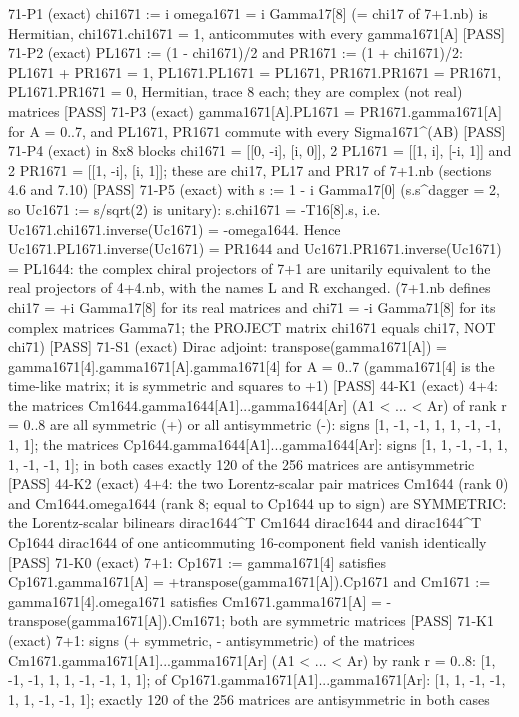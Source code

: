 \documentclass[
  10pt,
]{article}
\newenvironment{Shaded}{}{}
\newcommand{\NormalTok}[1]{#1}
\begin{document}
\begin{Shaded}
\begin{Highlighting}[]
\NormalTok{[PASS] 71{-}P1  (exact) chi1671 := i omega1671 = i Gamma17[8] (= chi17 of 7+1.nb) is Hermitian, chi1671.chi1671 = 1, anticommutes with every gamma1671[A]}
\NormalTok{[PASS] 71{-}P2  (exact) PL1671 := (1 {-} chi1671)/2 and PR1671 := (1 + chi1671)/2: PL1671 + PR1671 = 1, PL1671.PL1671 = PL1671, PR1671.PR1671 = PR1671, PL1671.PR1671 = 0, Hermitian, trace 8 each; they are complex (not real) matrices}
\NormalTok{[PASS] 71{-}P3  (exact) gamma1671[A].PL1671 = PR1671.gamma1671[A] for A = 0..7, and PL1671, PR1671 commute with every Sigma1671\^{}(AB)}
\NormalTok{[PASS] 71{-}P4  (exact) in 8x8 blocks chi1671 = [[0, {-}i], [i, 0]], 2 PL1671 = [[1, i], [{-}i, 1]] and 2 PR1671 = [[1, {-}i], [i, 1]]; these are chi17, PL17 and PR17 of 7+1.nb (sections 4.6 and 7.10)}
\NormalTok{[PASS] 71{-}P5  (exact) with s := 1 {-} i Gamma17[0] (s.s\^{}dagger = 2, so Uc1671 := s/sqrt(2) is unitary): s.chi1671 = {-}T16[8].s, i.e. Uc1671.chi1671.inverse(Uc1671) = {-}omega1644.  Hence Uc1671.PL1671.inverse(Uc1671) = PR1644 and Uc1671.PR1671.inverse(Uc1671) = PL1644: the complex chiral projectors of 7+1 are unitarily equivalent to the real projectors of 4+4.nb, with the names L and R exchanged.  (7+1.nb defines chi17 = +i Gamma17[8] for its real matrices and chi71 = {-}i Gamma71[8] for its complex matrices Gamma71; the PROJECT matrix chi1671 equals chi17, NOT chi71)}
\NormalTok{[PASS] 71{-}S1  (exact) Dirac adjoint: transpose(gamma1671[A]) = gamma1671[4].gamma1671[A].gamma1671[4] for A = 0..7 (gamma1671[4] is the time{-}like matrix; it is symmetric and squares to +1)}
\NormalTok{[PASS] 44{-}K1  (exact) 4+4: the matrices Cm1644.gamma1644[A1]...gamma1644[Ar] (A1 \textless{} ... \textless{} Ar) of rank r = 0..8 are all symmetric (+) or all antisymmetric ({-}): signs [1, {-}1, {-}1, 1, 1, {-}1, {-}1, 1, 1]; the matrices Cp1644.gamma1644[A1]...gamma1644[Ar]: signs [1, 1, {-}1, {-}1, 1, 1, {-}1, {-}1, 1]; in both cases exactly 120 of the 256 matrices are antisymmetric}
\NormalTok{[PASS] 44{-}K2  (exact) 4+4: the two Lorentz{-}scalar pair matrices Cm1644 (rank 0) and Cm1644.omega1644 (rank 8; equal to Cp1644 up to sign) are SYMMETRIC: the Lorentz{-}scalar bilinears dirac1644\^{}T Cm1644 dirac1644 and dirac1644\^{}T Cp1644 dirac1644 of one anticommuting 16{-}component field vanish identically}
\NormalTok{[PASS] 71{-}K0  (exact) 7+1: Cp1671 := gamma1671[4] satisfies Cp1671.gamma1671[A] = +transpose(gamma1671[A]).Cp1671 and Cm1671 := gamma1671[4].omega1671 satisfies Cm1671.gamma1671[A] = {-}transpose(gamma1671[A]).Cm1671; both are symmetric matrices}
\NormalTok{[PASS] 71{-}K1  (exact) 7+1: signs (+ symmetric, {-} antisymmetric) of the matrices Cm1671.gamma1671[A1]...gamma1671[Ar] (A1 \textless{} ... \textless{} Ar) by rank r = 0..8: [1, {-}1, {-}1, 1, 1, {-}1, {-}1, 1, 1]; of Cp1671.gamma1671[A1]...gamma1671[Ar]: [1, 1, {-}1, {-}1, 1, 1, {-}1, {-}1, 1]; exactly 120 of the 256 matrices are antisymmetric in both cases}

\end{Highlighting}
\end{Shaded}
\end{document}
